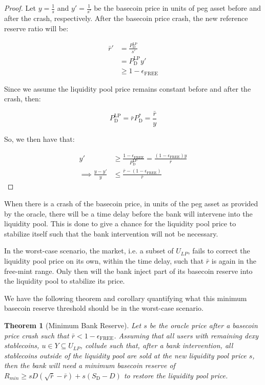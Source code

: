 \documentclass{ifcolog}
\newcommand{\Pdt}{P_{\mathrm{D}}^{*}}
\newcommand{\Plp}{P_{\mathrm{D}}^{\mathrm{LP}}}
\newcommand{\Sd}{S_{\mathrm{D}}}
\newcommand{\rr}{\bar{r}}
\newcommand{\epsilonfree}{\epsilon_{\textrm{FREE}}}
\newtheorem{theorem}{Theorem}
\begin{document}
\begin{proof}
  Let $y = \frac{1}{s}$ and $y' = \frac{1}{s'}$ be the basecoin price in units of peg asset before 
  and after the crash, respectively. After the basecoin price crash, the new reference 
  reserve ratio will be:
  
  \begin{align}
    \rr' &= \frac{\Plp}{s'} \\ 
         &= \Plp y' \\
         &\ge 1 - \epsilonfree
  \end{align}

  Since we assume the liquidity pool price remains constant before and after the crash, then:
  
  \begin{equation}
    \Plp = \rr \Pdt = \frac{\rr}{y}
  \end{equation}

  So, we then have that:
  
  \begin{align}
    y' &\ge \frac{1-\epsilonfree}{\Plp} = \frac{(1-\epsilonfree)y}{\rr} \\
       \implies \frac{y - y'}{y} &\le \frac{\rr - (1-\epsilonfree)}{\rr}
  \end{align}
\end{proof}

When there is a crash of the basecoin price, in units of the peg asset as provided by the oracle, 
there will be a time delay before the bank will intervene into the liquidity pool.
This is done to give a chance for the liquidity pool price to stabilize itself such that the bank intervention
will not be necessary. 

In the worst-case scenario, the market, i.e. a subset of $U_{LP}$, fails to correct the liquidity pool price on its own, 
within the time delay, such that $\rr$ is again in the free-mint range. Only then will the bank inject 
part of its basecoin reserve into the liquidity pool to stabilize its price. 

We have the following theorem and corollary quantifying what this minimum basecoin reserve threshold
should be in the worst-case scenario.

\begin{theorem}[Minimum Bank Reserve]
  \label{theorem:minimum-bank-reserve}
  Let $s$ be the oracle price after a basecoin price crash such that $\rr < 1 - \epsilonfree$. 
  Assuming that all users with remaining dexy stablecoins, $u \in Y \subseteq U_{LP}$, collude such that, after a bank intervention, all stablecoins 
  outside of the liquidity pool are sold at the new liquidity pool price $s$, then the bank will need
  a minimum basecoin reserve of $R_{min} \ge sD(\sqrt{\rr} - \rr) + s(\Sd - D)$ to restore the liquidity pool price.
\end{theorem}
\end{document}
